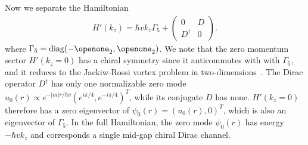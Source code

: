 Now we separate the Hamiltonian \begin{align}H'(k_z)=\hbar vk_z\Gamma_5+\left(\begin{smallmatrix}0&D\\D^\dagger&0\end{smallmatrix}\right).\end{align} where $\Gamma_5=\mathrm{diag}(-\openone_2,\openone_2)$. We note that the zero momentum sector $H'(k_z=0)$ has a chiral symmetry since it anticommutes with with $\Gamma_5$, and it reduces to the Jackiw-Rossi vortex problem in two-dimensions~\cite{JackiwRossi81}. The Dirac operator $D^\dagger$ has only one normalizable zero mode $u_0(r)\propto e^{-|m|r/\hbar v}(e^{i\pi/4}, e^{-i\pi/4})^T$, while its conjugate $D$ has none. $H'(k_z=0)$ therefore has a zero eigenvector of $\psi_0(r)=(u_0(r),0)^T$, which is also an eigenvector of $\Gamma_5$. In the full Hamiltonian, the zero mode $\psi_0(r)$ has energy $-\hbar vk_z$ and corresponds a single mid-gap chiral Dirac channel.